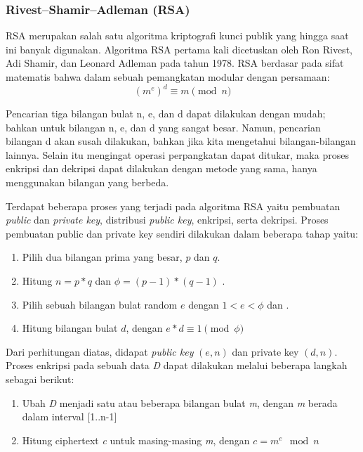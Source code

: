     \subsubsection{Rivest–Shamir–Adleman (RSA)} \label{sec:rsa_theory}
    RSA merupakan salah satu algoritma kriptografi kunci publik yang hingga saat ini banyak digunakan. Algoritma RSA pertama kali dicetuskan oleh Ron Rivest, Adi Shamir, dan Leonard Adleman pada tahun 1978. RSA berdasar pada sifat matematis bahwa dalam sebuah pemangkatan modular dengan persamaan:
    \begin{equation}
      (m^e)^d  \equiv  m \pmod{n}
    \end{equation}

    Pencarian tiga bilangan bulat n, e, dan d dapat dilakukan dengan mudah; bahkan untuk bilangan n, e, dan d yang sangat besar. Namun, pencarian bilangan d akan susah dilakukan, bahkan jika kita mengetahui bilangan-bilangan lainnya. Selain itu mengingat operasi perpangkatan dapat ditukar, maka proses enkripsi dan dekripsi dapat dilakukan dengan metode yang sama, hanya menggunakan bilangan yang berbeda.

    Terdapat beberapa proses yang terjadi pada algoritma RSA yaitu pembuatan \textit{public} dan \textit{private key}, distribusi \textit{public key}, enkripsi, serta dekripsi. Proses pembuatan public dan private key sendiri dilakukan dalam beberapa tahap yaitu:

    \begin{enumerate}
      \item Pilih dua bilangan prima yang besar, $p$ dan $q$.
      \item Hitung $n = p*q$ dan $ \phi = (p-1)*(q-1)$ .
      \item Pilih sebuah bilangan bulat random $e$ dengan $ 1 < e < \phi$ dan .
      \item Hitung bilangan bulat $d$, dengan $ e*d  \equiv  1 \pmod{\phi} $
    \end{enumerate}

    Dari perhitungan diatas, didapat \textit{public key} $(e, n)$ dan private key $(d, n)$.
    Proses enkripsi pada sebuah data \textit{D} dapat dilakukan melalui beberapa langkah sebagai berikut:
    \begin{enumerate}
      \item Ubah \textit{D} menjadi satu atau beberapa bilangan bulat \textit{m}, dengan \textit{m} berada dalam interval [1..n-1]
      \item Hitung ciphertext \textit{c} untuk masing-masing \textit{m}, dengan $c = m^e \mod n $
    \end{enumerate}

